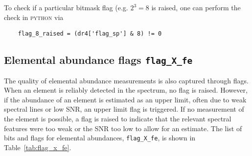 \documentclass[
  journal=pasa,
  manuscript=research-paper, %
  year=2024,
  volume=37
]{cup-journal}
\begin{document}
To check if a particular bitmask flag (e.g. $2^3 = 8$ is raised, one can perform the check in \textsc{python} via
\begin{verbatim}
    flag_8_raised = (dr4['flag_sp'] & 8) != 0
\end{verbatim}

\subsection{Elemental abundance flags \texttt{flag\_X\_fe}}
\label{sec:flag_x_fe}

The quality of elemental abundance measurements is also captured through flags. When an element is reliably detected in the spectrum, no flag is raised. However, if the abundance of an element is estimated as an upper limit, often due to weak spectral lines or low SNR, an upper limit flag is triggered. If no measurement of the element is possible, a flag is raised to indicate that the relevant spectral features were too weak or the SNR too low to allow for an estimate. The list of bits and flags for elemental abundances, \texttt{flag\_X\_fe}, is shown in Table~\ref{tab:flag_x_fe}.
\end{document}
